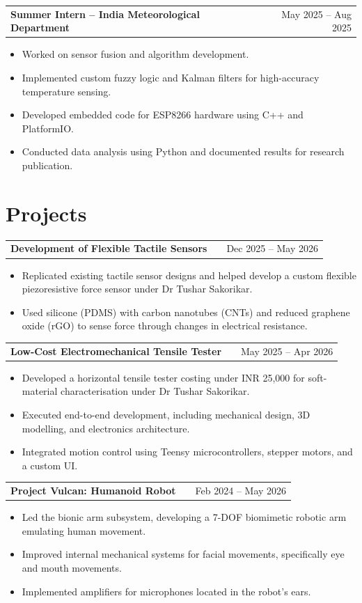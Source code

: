 \documentclass[a4paper,12pt]{article}
\makeatletter
\newenvironment{joblong}[2]
    {\begin{tabularx}{\linewidth}{@{}l X r@{}} \textbf{#1} & \hfill &  #2 \\[3.75pt] \end{tabularx}
    \begin{minipage}[t]{\linewidth}\raggedright
    \begin{itemize}[nosep,after=\strut, leftmargin=1em, itemsep=3pt,label=--]}
    {\end{itemize} \end{minipage}}
\makeatother
\begin{document}
\begin{joblong}{Summer Intern -- India Meteorological Department \href{https://github.com/KevinBMathew/SensorFusion_ESP8266}{\raisebox{-0.05\height}\faGithub}}{May 2025 -- Aug 2025}
\item Worked on sensor fusion and algorithm development.
\item Implemented custom fuzzy logic and Kalman filters for high-accuracy temperature sensing.
\item Developed embedded code for ESP8266 hardware using C++ and PlatformIO.
\item Conducted data analysis using Python and documented results for research publication.
\end{joblong}

\section{Projects}

\begin{joblong}{Development of Flexible Tactile Sensors}{Dec 2025 -- May 2026}
\item Replicated existing tactile sensor designs and helped develop a custom flexible piezoresistive force sensor under Dr Tushar Sakorikar.
\item Used silicone (PDMS) with carbon nanotubes (CNTs) and reduced graphene oxide (rGO) to sense force through changes in electrical resistance.
\end{joblong}

\begin{joblong}{Low-Cost Electromechanical Tensile Tester}{May 2025 -- Apr 2026}
\item Developed a horizontal tensile tester costing under INR 25,000 for soft-material characterisation under Dr Tushar Sakorikar.
\item Executed end-to-end development, including mechanical design, 3D modelling, and electronics architecture.
\item Integrated motion control using Teensy microcontrollers, stepper motors, and a custom UI.
\end{joblong}

\begin{joblong}{Project Vulcan: Humanoid Robot \href{https://github.com/ERC-BPGC/project-vulcan}{\raisebox{-0.05\height}\faGithub}}{Feb 2024 -- May 2026}
\item Led the bionic arm subsystem, developing a 7-DOF biomimetic robotic arm emulating human movement.
\item Improved internal mechanical systems for facial movements, specifically eye and mouth movements.
\item Implemented amplifiers for microphones located in the robot's ears.
\end{joblong}
\end{document}
